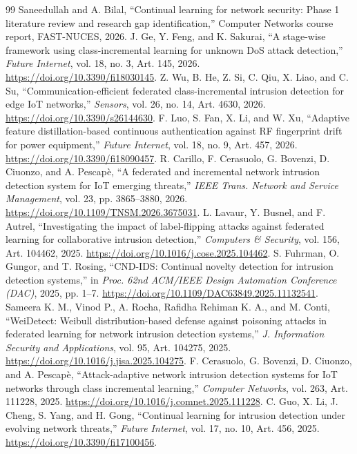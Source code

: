 \documentclass[10pt,a4paper]{article}
\begin{document}
\begin{thebibliography}{99}
 Saneedullah and A. Bilal, \enquote{Continual learning for network security: Phase 1 literature review and research gap identification,} Computer Networks course report, FAST-NUCES, 2026.
 J. Ge, Y. Feng, and K. Sakurai, \enquote{A stage-wise framework using class-incremental learning for unknown DoS attack detection,} \emph{Future Internet}, vol. 18, no. 3, Art. 145, 2026. \url{https://doi.org/10.3390/fi18030145}.
 Z. Wu, B. He, Z. Si, C. Qiu, X. Liao, and C. Su, \enquote{Communication-efficient federated class-incremental intrusion detection for edge IoT networks,} \emph{Sensors}, vol. 26, no. 14, Art. 4630, 2026. \url{https://doi.org/10.3390/s26144630}.
 F. Luo, S. Fan, X. Li, and W. Xu, \enquote{Adaptive feature distillation-based continuous authentication against RF fingerprint drift for power equipment,} \emph{Future Internet}, vol. 18, no. 9, Art. 457, 2026. \url{https://doi.org/10.3390/fi18090457}.
 R. Carillo, F. Cerasuolo, G. Bovenzi, D. Ciuonzo, and A. Pescap\`e, \enquote{A federated and incremental network intrusion detection system for IoT emerging threats,} \emph{IEEE Trans. Network and Service Management}, vol. 23, pp. 3865--3880, 2026. \url{https://doi.org/10.1109/TNSM.2026.3675031}.
 L. Lavaur, Y. Busnel, and F. Autrel, \enquote{Investigating the impact of label-flipping attacks against federated learning for collaborative intrusion detection,} \emph{Computers \& Security}, vol. 156, Art. 104462, 2025. \url{https://doi.org/10.1016/j.cose.2025.104462}.
 S. Fuhrman, O. Gungor, and T. Rosing, \enquote{CND-IDS: Continual novelty detection for intrusion detection systems,} in \emph{Proc. 62nd ACM/IEEE Design Automation Conference (DAC)}, 2025, pp. 1--7. \url{https://doi.org/10.1109/DAC63849.2025.11132541}.
 Sameera K. M., Vinod P., A. Rocha, Rafidha Rehiman K. A., and M. Conti, \enquote{WeiDetect: Weibull distribution-based defense against poisoning attacks in federated learning for network intrusion detection systems,} \emph{J. Information Security and Applications}, vol. 95, Art. 104275, 2025. \url{https://doi.org/10.1016/j.jisa.2025.104275}.
 F. Cerasuolo, G. Bovenzi, D. Ciuonzo, and A. Pescap\`e, \enquote{Attack-adaptive network intrusion detection systems for IoT networks through class incremental learning,} \emph{Computer Networks}, vol. 263, Art. 111228, 2025. \url{https://doi.org/10.1016/j.comnet.2025.111228}.
 C. Guo, X. Li, J. Cheng, S. Yang, and H. Gong, \enquote{Continual learning for intrusion detection under evolving network threats,} \emph{Future Internet}, vol. 17, no. 10, Art. 456, 2025. \url{https://doi.org/10.3390/fi17100456}.

\end{thebibliography}
\end{document}
